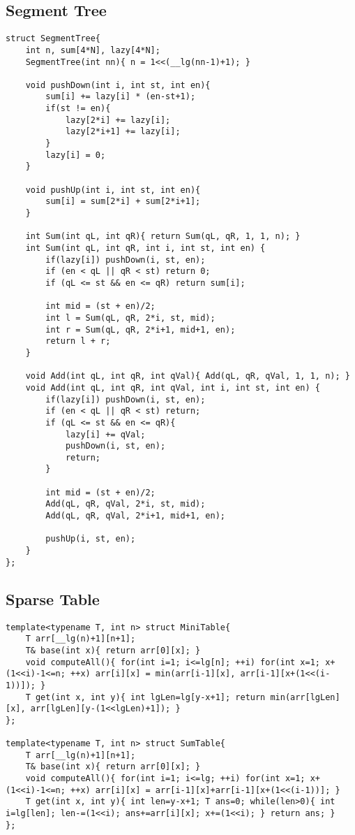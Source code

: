 \documentclass[12pt,a4paper,onesided]{article}
\begin{document}
\begin{multicols}{3}
\subsection{Segment Tree}
\begin{lstlisting}
struct SegmentTree{
	int n, sum[4*N], lazy[4*N];
    SegmentTree(int nn){ n = 1<<(__lg(nn-1)+1); }
	
    void pushDown(int i, int st, int en){
        sum[i] += lazy[i] * (en-st+1);
        if(st != en){
            lazy[2*i] += lazy[i];
            lazy[2*i+1] += lazy[i];
        }
        lazy[i] = 0;
    }

    void pushUp(int i, int st, int en){
        sum[i] = sum[2*i] + sum[2*i+1];
    }

    int Sum(int qL, int qR){ return Sum(qL, qR, 1, 1, n); }
	int Sum(int qL, int qR, int i, int st, int en) {
        if(lazy[i]) pushDown(i, st, en);
		if (en < qL || qR < st) return 0;
        if (qL <= st && en <= qR) return sum[i];
 
		int mid = (st + en)/2;
		int l = Sum(qL, qR, 2*i, st, mid);
		int r = Sum(qL, qR, 2*i+1, mid+1, en); 
		return l + r;
	}
	
    void Add(int qL, int qR, int qVal){ Add(qL, qR, qVal, 1, 1, n); }
	void Add(int qL, int qR, int qVal, int i, int st, int en) {
        if(lazy[i]) pushDown(i, st, en);
        if (en < qL || qR < st) return;
        if (qL <= st && en <= qR){
            lazy[i] += qVal;
            pushDown(i, st, en);
            return;
        }
 
		int mid = (st + en)/2;
		Add(qL, qR, qVal, 2*i, st, mid);
		Add(qL, qR, qVal, 2*i+1, mid+1, en);

        pushUp(i, st, en);
	}
};
\end{lstlisting}



\subsection{Sparse Table}
\begin{lstlisting}
template<typename T, int n> struct MiniTable{
	T arr[__lg(n)+1][n+1];
	T& base(int x){ return arr[0][x]; }
	void computeAll(){ for(int i=1; i<=lg[n]; ++i) for(int x=1; x+(1<<i)-1<=n; ++x) arr[i][x] = min(arr[i-1][x], arr[i-1][x+(1<<(i-1))]); }
	T get(int x, int y){ int lgLen=lg[y-x+1]; return min(arr[lgLen][x], arr[lgLen][y-(1<<lgLen)+1]); }
};

template<typename T, int n> struct SumTable{
	T arr[__lg(n)+1][n+1];
	T& base(int x){ return arr[0][x]; }
	void computeAll(){ for(int i=1; i<=lg; ++i) for(int x=1; x+(1<<i)-1<=n; ++x) arr[i][x] = arr[i-1][x]+arr[i-1][x+(1<<(i-1))]; }
	T get(int x, int y){ int len=y-x+1; T ans=0; while(len>0){ int i=lg[len]; len-=(1<<i); ans+=arr[i][x]; x+=(1<<i); } return ans; }
};



\end{lstlisting}
\end{multicols}
\end{document}
